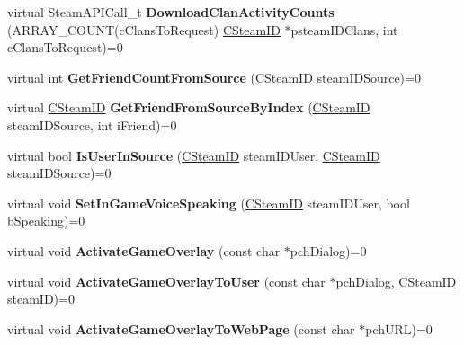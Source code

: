 \begin{DoxyCompactItemize}
virtual Steam\+A\+P\+I\+Call\+\_\+t {\bfseries Download\+Clan\+Activity\+Counts} (A\+R\+R\+A\+Y\+\_\+\+C\+O\+U\+NT(c\+Clans\+To\+Request) \hyperlink{class_c_steam_i_d}{C\+Steam\+ID} $\ast$psteam\+I\+D\+Clans, int c\+Clans\+To\+Request)=0
\item 
\mbox{\label{class_i_steam_friends_affdd9c69c64cd4725d86ff591a1cd8b4}} 
virtual int {\bfseries Get\+Friend\+Count\+From\+Source} (\hyperlink{class_c_steam_i_d}{C\+Steam\+ID} steam\+I\+D\+Source)=0
\item 
\mbox{\label{class_i_steam_friends_a0fd81e3ab7aa52018dfce8ccdd5c611a}} 
virtual \hyperlink{class_c_steam_i_d}{C\+Steam\+ID} {\bfseries Get\+Friend\+From\+Source\+By\+Index} (\hyperlink{class_c_steam_i_d}{C\+Steam\+ID} steam\+I\+D\+Source, int i\+Friend)=0
\item 
\mbox{\label{class_i_steam_friends_ac52308fb74d4b3fe72a29d896eceb2c1}} 
virtual bool {\bfseries Is\+User\+In\+Source} (\hyperlink{class_c_steam_i_d}{C\+Steam\+ID} steam\+I\+D\+User, \hyperlink{class_c_steam_i_d}{C\+Steam\+ID} steam\+I\+D\+Source)=0
\item 
\mbox{\label{class_i_steam_friends_ac6de0a382cf904b81aba7a2ecdf45d1e}} 
virtual void {\bfseries Set\+In\+Game\+Voice\+Speaking} (\hyperlink{class_c_steam_i_d}{C\+Steam\+ID} steam\+I\+D\+User, bool b\+Speaking)=0
\item 
\mbox{\label{class_i_steam_friends_a6fef6a8e1f6a4b54e46392b8066a2bc1}} 
virtual void {\bfseries Activate\+Game\+Overlay} (const char $\ast$pch\+Dialog)=0
\item 
\mbox{\label{class_i_steam_friends_abdf45d1ba2d1daffc0d09bf6ac1565a7}} 
virtual void {\bfseries Activate\+Game\+Overlay\+To\+User} (const char $\ast$pch\+Dialog, \hyperlink{class_c_steam_i_d}{C\+Steam\+ID} steam\+ID)=0
\item 
\mbox{\label{class_i_steam_friends_a4bc559ed248ea4738d5a08fdf134e26a}} 
virtual void {\bfseries Activate\+Game\+Overlay\+To\+Web\+Page} (const char $\ast$pch\+U\+RL)=0
\item 
\mbox{\label{class_i_steam_friends_a13c43e63a8e92cd113032a8934953d09}} 

\end{DoxyCompactItemize}
